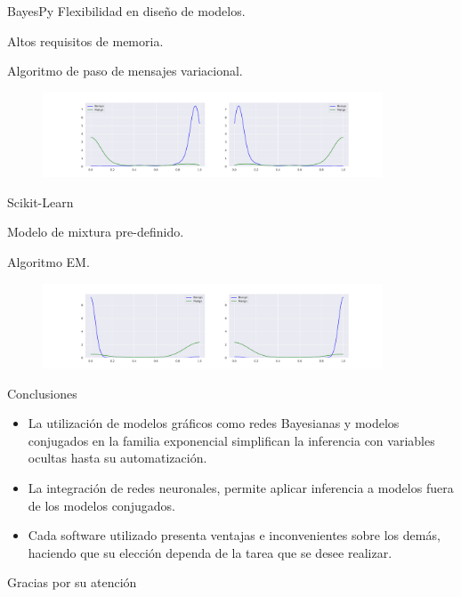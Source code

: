 \documentclass[aspectratio=169]{beamer}
\begin{document}
    \begin{frame}{BayesPy}
      Flexibilidad en diseño de modelos.

      Altos requisitos de memoria.

      Algoritmo de paso de mensajes variacional.
    \captionsetup[subfigure]{labelformat=empty}
     \begin{figure}[h]
       \centering
         \includegraphics[width=0.9\textwidth]{tex/images/proba_reduced_bayes.pdf}
     \end{figure}
    \end{frame}
    \begin{frame}{Scikit-Learn}

      Modelo de mixtura pre-definido.

      Algoritmo EM.

    \captionsetup[subfigure]{labelformat=empty}
     \begin{figure}[h]
       \centering
         \includegraphics[width=0.9\textwidth]{tex/images/proba_observed.pdf}
     \end{figure}
    \end{frame}


    \begin{frame}{Conclusiones}

      \begin{itemize}
        \item La utilización de modelos gráficos como redes Bayesianas y modelos conjugados en la familia exponencial simplifican la inferencia con variables ocultas hasta su automatización.
        \item La integración de redes neuronales, permite aplicar inferencia a modelos fuera de los modelos conjugados.
        \item Cada software utilizado presenta ventajas e inconvenientes sobre los demás, haciendo que su elección dependa de la tarea que se desee realizar.
      \end{itemize}
    \end{frame}

    \begin{frame}[standout]
      Gracias por su atención
    \end{frame}
\end{document}
